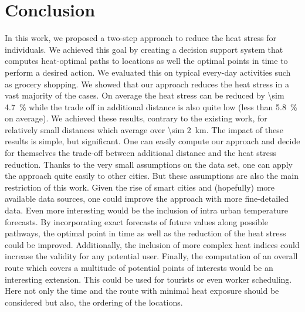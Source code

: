 
\section{Conclusion}

In this work, we proposed a two-step approach to reduce the heat stress for individuals. We achieved this goal by creating a decision support system that computes heat-optimal paths to locations as well the optimal points in time to perform a desired action. We evaluated this on typical every-day activities such as grocery shopping. 
We showed that our approach reduces the heat stress in a vast majority of the cases. On average the heat stress can be reduced by \SI{\sim 4.7}{\percent} while the trade off in additional distance is also quite low (less than \SI{5.8}{\percent} on average). We achieved these results, contrary to the existing work, for relatively small distances which average over \SI{\sim  2}{\kilo\meter}.
The impact of these results is simple, but significant. One can easily compute our approach and decide for themselves the trade-off between additional distance and the heat stress reduction.
Thanks to the very small assumptions on the data set, one can apply the approach quite easily to other cities. 
But these assumptions are also the main restriction of this work. Given the rise of smart cities and (hopefully) more available data sources, one could improve the approach with more fine-detailed data. Even more interesting would be the inclusion of intra urban temperature forecasts. By incorporating exact forecasts of future values along possible pathways, the optimal point in time as well as the reduction of the heat stress could be improved. Additionally, the inclusion of more complex heat indices could increase the validity for any potential user. 
Finally, the computation of an overall route which covers a multitude of potential points of interests would be an interesting extension. This could be used for tourists or even worker scheduling. Here not only the time and the route with minimal heat exposure should be considered but also, the ordering of the locations.  